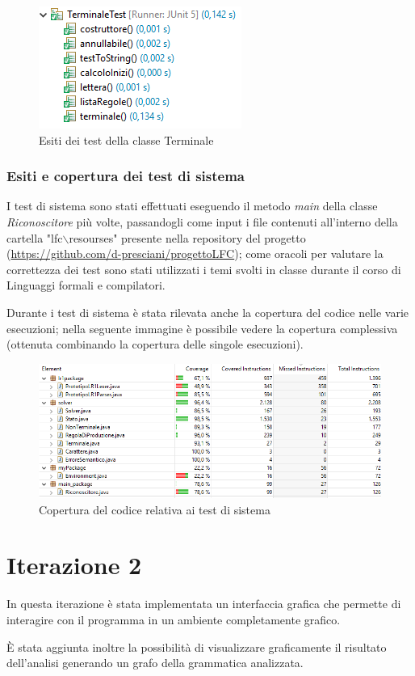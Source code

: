 \documentclass[12pt]{article}
\begin{document}
\begin{figure}[h]
\centering
\includegraphics[scale=0.9]{immagini/V1esitiTerminaleTest.png}
\caption{Esiti dei test della classe Terminale}
\end{figure}
\pagebreak

\subsubsection{Esiti e copertura dei test di sistema}
I test di sistema sono stati effettuati eseguendo il metodo \textit{main} della classe \textit{Riconoscitore} più volte, passandogli come input i file contenuti all'interno della cartella "lfc$\backslash$resourses" presente nella repository del progetto (\url{https://github.com/d-presciani/progettoLFC}); come oracoli per valutare la correttezza dei test sono stati utilizzati i temi svolti in classe durante il corso di Linguaggi formali e compilatori. \par
Durante i test di sistema è stata rilevata anche la copertura del codice nelle varie esecuzioni; nella seguente immagine è possibile vedere la copertura complessiva (ottenuta combinando la copertura delle singole esecuzioni).
\begin{figure}[h]
\centering
\includegraphics[width=\textwidth]{immagini/V1codeCoverage.png}
\caption{Copertura del codice relativa ai test di sistema}
\end{figure}
\pagebreak

\section{Iterazione 2}
In questa iterazione è stata implementata un interfaccia grafica che permette di interagire con il programma in un ambiente completamente grafico.\par
È stata aggiunta inoltre la possibilità di visualizzare graficamente il risultato dell'analisi generando un grafo della grammatica analizzata.
\end{document}
